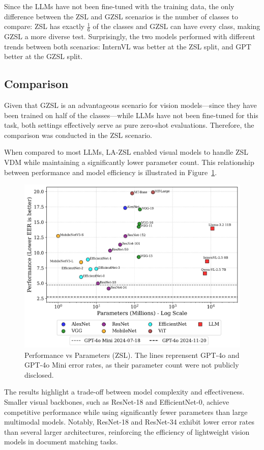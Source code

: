 Since the \glspl{LLM} have not been fine-tuned with the training data, the only difference between the \gls{ZSL} and \gls{GZSL} scenarios is the number of classes to compare: \gls{ZSL} has exactly $\frac{1}{6}$ of the classes and \gls{GZSL} can have every class, making \gls{GZSL} a more diverse test. Surprisingly, the two models performed with different trends between both scenarios: InternVL was better at the \gls{ZSL} split, and GPT better at the \gls{GZSL} split.

\subsection{Comparison}
\label{sec:comparison_result}

Given that \gls{GZSL} is an advantageous scenario for vision models—since they have been trained on half of the classes—while \glspl{LLM} have not been fine-tuned for this task, both settings effectively serve as pure zero-shot evaluations. Therefore, the comparison was conducted in the \gls{ZSL} scenario.

When compared to most \glspl{LLM}, \gls{LA-ZSL} enabled visual models to handle \gls{ZSL} \gls{VDM} while maintaining a significantly lower parameter count. This relationship between performance and model efficiency is illustrated in Figure~\ref{fig:performance}.

\begin{figure}[htbp]
\centering
\includegraphics[width=1\linewidth]{images/performance_vs_parameters.png}
\caption{Performance vs Parameters (ZSL)\label{fig:performance}. The lines reprensent GPT-4o and GPT-4o Mini error rates, as their parameter count were not publicly disclosed.}
\end{figure}  

The results highlight a trade-off between model complexity and effectiveness. Smaller visual backbones, such as ResNet-18 and EfficientNet-0, achieve competitive performance while using significantly fewer parameters than large multimodal models. Notably, ResNet-18 and ResNet-34 exhibit lower error rates than several larger architectures, reinforcing the efficiency of lightweight vision models in document matching tasks.
